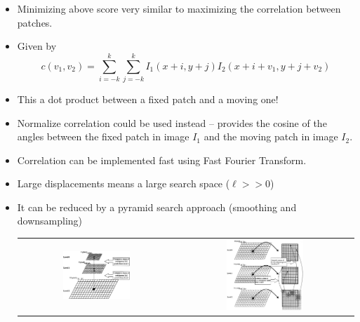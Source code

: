 \documentclass[10pt]{beamer}
\begin{document}
\begin{frame}
  \begin{itemize}
  \item Minimizing above score very similar to maximizing the correlation between patches.
  \item Given by
    $$
    c(v_1,v_2) = \sum_{i=-k}^k\sum_{j=-k}^k I_1(x+i,y+j)I_2(x+i+v_1,y+j+v_2)
    $$
  \item This a dot product between a fixed patch and a moving one!
  \item Normalize correlation could be used instead -- provides the
    cosine of the angles between the fixed patch in image $I_1$ and
    the moving patch in image $I_2$.
  \item Correlation can be implemented fast using Fast Fourier Transform.
  \end{itemize}
\end{frame}


\begin{frame}
   \begin{itemize}
   \item Large displacements means a large search space ($\ell >> 0$)
   \item It can be reduced by a pyramid search approach (smoothing and downsampling)
     \begin{center}
       \begin{tabular}[h]{cc}
         \includegraphics[width=0.45\textwidth]{FIGURES/bmpyramid1}&
         \includegraphics[width=0.45\textwidth]{FIGURES/bmpyramid2}
       \end{tabular}
     \end{center}
   \end{itemize}   
\end{frame}
\end{document}
